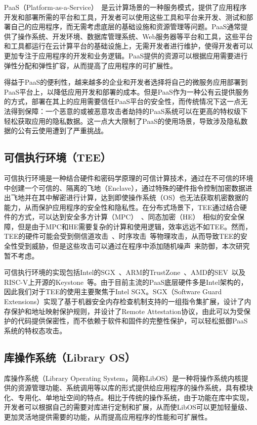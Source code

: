 PaaS（Platform-as-a-Service）~\cite{}是云计算场景的一种服务模式，提供了应用程序开发和部署所需的平台和工具，开发者可以使用这些工具和平台来开发、测试和部署自己的应用程序，而无需考虑底层的基础设施和资源管理等问题。PaaS通常提供了操作系统、开发环境、数据库管理系统、Web服务器等平台和工具，这些平台和工具都运行在云计算平台的基础设施上，无需开发者进行维护，使得开发者可以更加专注于应用程序的开发和业务逻辑。PaaS提供的资源可以根据应用需要进行弹性分配和弹性扩容，从而提高了应用程序的可扩展性。

得益于PaaS的便利性，越来越多的企业和开发者选择将自己的微服务应用部署到PaaS平台上，以降低应用开发和部署的成本。但是PaaS作为一种公有云提供服务的方式，部署在其上的应用需要信任PaaS平台的安全性，而传统情况下这一点无法得到保障：一个恶意的或被恶意攻击者劫持的PaaS系统可以在更高的特权级下轻松获取应用的隐私数据。这一点大大限制了PaaS的使用场景，导致涉及隐私数据的公有云使用遭到了严重挑战。

\subsection{可信执行环境（TEE）}

可信执行环境是一种结合硬件和密码学原理的可信计算技术，通过在不可信的环境中创建一个可信的、隔离的飞地（Enclave），通过特殊的硬件指令控制加密数据进出飞地并在其中解密进行计算，达到即使操作系统（OS）也无法获取机密数据的能力，从而保护应用程序的安全性和隐私性。在分布式场景下，TEE通过结合硬件的方式，可以达到安全多方计算（MPC）~\cite{}、同态加密（HE）~\cite{}相似的安全保障，但是由于MPC和HE需要复杂的计算和使用逻辑，效率远远不如TEE。然而，TEE的硬件可能会受到侧信道攻击~\cite{}、时序攻击~\cite{}等物理攻击，从而导致TEE的安全性受到威胁，但是这些攻击可以通过在程序中添加随机噪声~\cite{}来防御，本次研究暂不考虑。

可信执行环境的实现包括Intel的SGX~\cite{}、ARM的TrustZone~\cite{}、AMD的SEV~\cite{}以及RISC-V上开源的Keystone~\cite{}等。由于目前主流的PaaS底层硬件多是Intel架构的，因此我们对于TEE的使用主要聚焦于Intel SGX。SGX（Software Guard Extensions）实现了基于机器安全内存检查机制支持的一组指令集扩展，设计了内存保护和地址映射保护规则，并设计了Remote Attestation协议，由此可以为受保护的代码提供保密性，而不依赖于软件和固件的完整性保护，可以轻松抵御PaaS系统的特权态攻击。

\subsection{库操作系统（Library OS）}

库操作系统（Library Operating System，简称LibOS）是一种将操作系统内核提供的资源管理功能、系统调用等以库的形式提供给应用程序的操作系统，具有模块化、专用化、单地址空间的特点。相比于传统的操作系统，由于功能在库中实现，开发者可以根据自己的需要对库进行定制和扩展，从而使LibOS可以更加轻量级、更加灵活地提供需要的功能，从而提高应用程序的性能和可扩展性。


